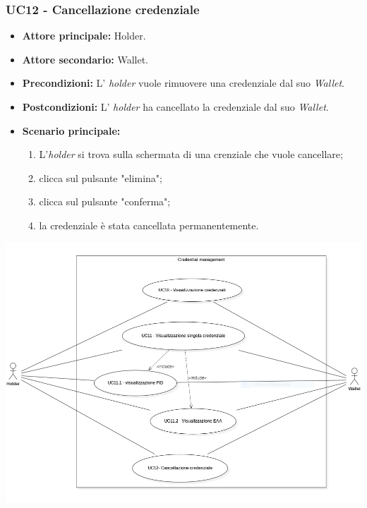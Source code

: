 \subsubsection{UC12 - Cancellazione credenziale}
\begin{itemize}
\item \textbf{Attore principale:} Holder.
\item \textbf{Attore secondario:} Wallet.
\item \textbf{Precondizioni:} L' \textit{holder} vuole rimuovere una credenziale dal suo \textit{Wallet}.
\item \textbf{Postcondizioni:} L' \textit{holder} ha cancellato la credenziale dal suo \textit{Wallet}.
\item \textbf{Scenario principale:} 
    \begin{enumerate}
    \item L'\textit{holder} si trova sulla schermata di una crenziale che vuole cancellare; 
    \item clicca sul pulsante "elimina"; 
    \item clicca sul pulsante "conferma"; 
    \item la credenziale è stata cancellata permanentemente.
    \end{enumerate}
\end{itemize}

\begin{center}
    \includegraphics[scale = 0.65]{./res/img/UC3.PNG}
  \end{center}

